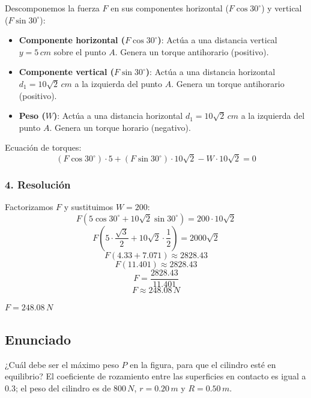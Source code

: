 \documentclass[12pt, a4paper]{article}
\begin{document}
Descomponemos la fuerza $F$ en sus componentes horizontal ($F \cos 30^\circ$) y vertical ($F \sin 30^\circ$):
\begin{itemize}
    \item \textbf{Componente horizontal ($F \cos 30^\circ$)}: Actúa a una distancia vertical $y = 5 \, \si{cm}$ sobre el punto $A$. Genera un torque antihorario (positivo).
    \item \textbf{Componente vertical ($F \sin 30^\circ$)}: Actúa a una distancia horizontal $d_1 = 10\sqrt{2} \, \si{cm}$ a la izquierda del punto $A$. Genera un torque antihorario (positivo).
    \item \textbf{Peso ($W$)}: Actúa a una distancia horizontal $d_1 = 10\sqrt{2} \, \si{cm}$ a la izquierda del punto $A$. Genera un torque horario (negativo).
\end{itemize}

Ecuación de torques:
$$(F \cos 30^\circ) \cdot 5 + (F \sin 30^\circ) \cdot 10\sqrt{2} - W \cdot 10\sqrt{2} = 0$$

\subsubsection*{4. Resolución}
Factorizamos $F$ y sustituimos $W = 200$:
$$F (5 \cos 30^\circ + 10\sqrt{2} \sin 30^\circ) = 200 \cdot 10\sqrt{2}$$
$$F (5 \cdot \frac{\sqrt{3}}{2} + 10\sqrt{2} \cdot \frac{1}{2}) = 2000\sqrt{2}$$
$$F (4.33 + 7.071) \approx 2828.43$$
$$F (11.401) \approx 2828.43$$
$$F = \frac{2828.43}{11.401}$$
$$F \approx 248.08 \, \si{N}$$

\begin{tcolorbox}[colback=green!5!white, colframe=green!50!black, title=Respuesta Final]
\centering \Large $F = 248.08 \, \si{N}$
\end{tcolorbox}

\newpage

\subsection*{Enunciado}
¿Cuál debe ser el máximo peso $P$ en la figura, para que el cilindro esté en equilibrio? El coeficiente de rozamiento entre las superficies en contacto es igual a $0.3$; el peso del cilindro es de $800 \, \si{N}$, $r = 0.20 \, \si{m}$ y $R = 0.50 \, \si{m}$.
\end{document}
